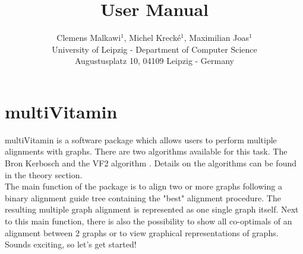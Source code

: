 \documentclass{SeminarV2}
\newcommand{\mV}{multiVitamin }
\begin{document}
\title{User Manual}

\author{Clemens Malkawi$^1$, Michel Krecké$^1$, Maximilian Joas$^1$
%
%
\vspace{.3cm}\\
%
University of Leipzig  - Department of Computer Science \\
Augustusplatz 10, 04109 Leipzig  - Germany\\}

%


\maketitle

\begin{abstract}


\end{abstract}

\section{multiVitamin}
\mV is a software package which allows users to perform multiple alignments with graphs.
There are two algorithms available for this task. The Bron Kerbosch \cite{}
and the VF2 algorithm \cite{}. Details on the algorithms can be found in the
theory section.\\
The main function of the package is to align two or more graphs following a binary alignment guide tree containing the "best" alignment procedure. The resulting multiple graph alignment is represented as one single graph itself. Next to this main function, there is also the possibility to show all co-optimals of an alignment between 2 graphs or to view graphical representations of graphs.  
Sounds exciting, so let's get started!
\end{document}
